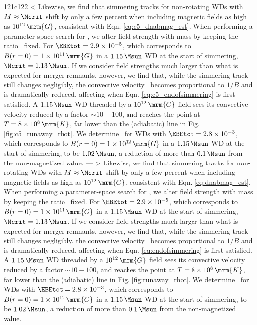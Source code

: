 121c122
< Likewise, we find that simmering tracks for non-rotating WDs with $M\approx\Mcrit$ shift by only a few percent when including magnetic fields as high as $10^{12}\,\mrm{G}$, consistent with Eqn. \ref{eq:c5_dnabmag_est}.  When performing a parameter-space search for \Mcrit, we alter field strength with mass by keeping the ratio \EBEtot\ fixed.  For $\EBEtot = 2.9\times10^{-5}$, which corresponds to $B(r=0) = 1\times10^{11}\,\mrm{G}$ in a $1.15\,\Msun$ WD at the start of simmering, $\Mcrit = 1.13\,\Msun$.  If we consider field strengths much larger than what is expected for merger remnants, however, we find that, while the simmering track still changes negligibly, the convective velocity \vconv\ becomes proportional to $1/B$ and is dramatically reduced, affecting when Eqn. \ref{eq:c5_endofsimmering} is first satisfied.  A $1.15\,\Msun$ WD threaded by a $10^{12}\,\mrm{G}$ field sees its convective velocity reduced by a factor $\sim 10 - 100$, and reaches the \citeal{wooswk04} point at $T = 8\times10^8\,\mrm{K}$, far lower than the (adiabatic) \citeal{wooswk04} line in Fig. \ref{fig:c5_runaway_rhot}.  We determine \Mcrit\ for WDs with $\EBEtot = 2.8\times10^{-3}$, which corresponds to $B(r=0) = 1\times10^{12}\,\mrm{G}$ in a $1.15\,\Msun$ WD at the start of simmering, to be $1.02\,\Msun$, a reduction of more than $0.1\,\Msun$ from the non-magnetized value.
---
> Likewise, we find that simmering tracks for non-rotating WDs with $M\approx\Mcrit$ shift by only a few percent when including magnetic fields as high as $10^{12}\,\mrm{G}$, consistent with Eqn. \ref{eq:dnabmag_est}.  When performing a parameter-space search for \Mcrit, we alter field strength with mass by keeping the ratio \EBEtot\ fixed.  For $\EBEtot = 2.9\times10^{-5}$, which corresponds to $B(r=0) = 1\times10^{11}\,\mrm{G}$ in a $1.15\,\Msun$ WD at the start of simmering, $\Mcrit = 1.13\,\Msun$.  If we consider field strengths much larger than what is expected for merger remnants, however, we find that, while the simmering track still changes negligibly, the convective velocity \vconv\ becomes proportional to $1/B$ and is dramatically reduced, affecting when Eqn. \ref{eq:endofsimmering} is first satisfied.  A $1.15\,\Msun$ WD threaded by a $10^{12}\,\mrm{G}$ field sees its convective velocity reduced by a factor $\sim 10 - 100$, and reaches the \citeal{wooswk04} point at $T = 8\times10^8\,\mrm{K}$, far lower than the (adiabatic) \citeal{wooswk04} line in Fig. \ref{fig:runaway_rhot}.  We determine \Mcrit\ for WDs with $\EBEtot = 2.8\times10^{-3}$, which corresponds to $B(r=0) = 1\times10^{12}\,\mrm{G}$ in a $1.15\,\Msun$ WD at the start of simmering, to be $1.02\,\Msun$, a reduction of more than $0.1\,\Msun$ from the non-magnetized value.
